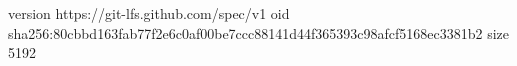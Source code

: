 version https://git-lfs.github.com/spec/v1
oid sha256:80cbbd163fab77f2e6c0af00be7ccc88141d44f365393c98afcf5168ec3381b2
size 5192
